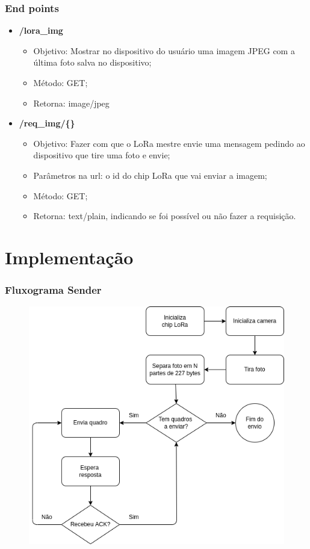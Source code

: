 \documentclass[12pt]{beamer}
\begin{document}
\begin{frame}
    \frametitle{End points}
    \begin{itemize}
        \item\textbf{/lora\_img}
            \begin{itemize}
                \item Objetivo: Mostrar no dispositivo do usuário uma imagem JPEG com a última foto salva no dispositivo;
                \item Método: GET;
                \item Retorna: image/jpeg
            \end{itemize}
        \item\textbf{/req\_img/\{\}}
            \begin{itemize}
                \item Objetivo: Fazer com que o LoRa mestre envie uma mensagem pedindo ao dispositivo que tire uma foto e envie;
                \item Parâmetros na url: o id do chip LoRa que vai enviar a imagem;
                \item Método: GET;
                \item Retorna: text/plain, indicando se foi possível ou não fazer a requisição.
            \end{itemize}
    \end{itemize}
\end{frame}

\section{Implementação}
\begin{frame}
    \frametitle{Fluxograma Sender}
    \begin{figure}[!h]
        \centering
        \includegraphics[width=.7\textwidth]{fluxogram_sender}
    \end{figure}
\end{frame}
\end{document}

